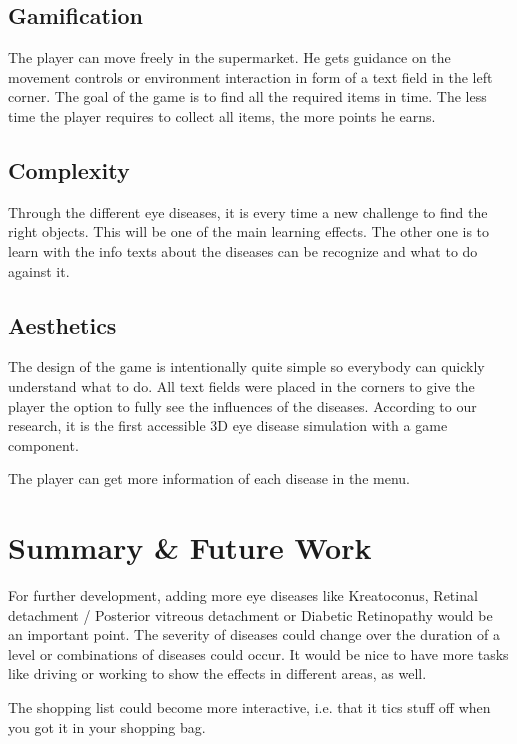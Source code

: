 \documentclass{sig-alternate-05-2015}
\begin{document}
\subsection{Gamification}

The player can move freely in the supermarket.
He gets guidance on the movement controls or environment interaction in form of a text field in the left corner.%
The goal of the game is to find all the required items in time.
The less time the player requires to collect all items, the more points he earns.

\subsection{Complexity}

Through the different eye diseases, it is every time a new challenge to find the right objects.
This will be one of the main learning effects.
The other one is to learn with the info texts about the diseases can be recognize and what to do against it.

\subsection{Aesthetics}

The design of the game is intentionally quite simple so everybody can quickly understand what to do.
All text fields were placed in the corners to give the player the option to fully see the influences of the diseases.
According to our research, it is the first accessible 3D eye disease simulation with a game component.

The player can get more information of each disease in the menu.
%
%
\section{Summary \& Future Work}

For further development, adding more eye diseases like Kreatoconus, Retinal detachment / Posterior vitreous detachment or Diabetic Retinopathy would be an important point.
The severity of diseases could change over the duration of a level or combinations of diseases could occur.
It would be nice to have more tasks like driving or working to show the effects in different areas, as well.

The shopping list could become more interactive, i.e. that it tics stuff off when you got it in your shopping bag.
\end{document}
